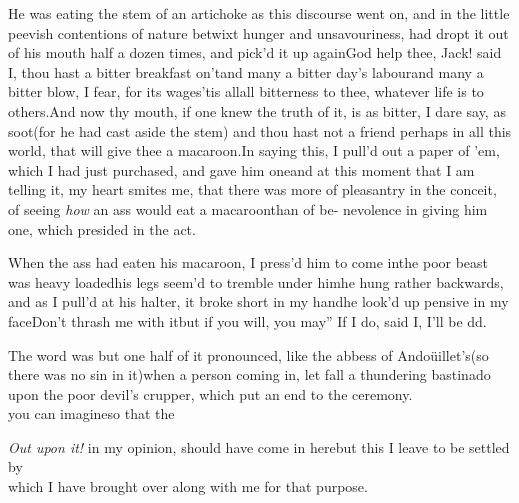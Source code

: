 \documentclass{article}
\begin{document}
He was eating the stem of an artichoke as this discourse went on, and in the little
peevish contentions of nature
betwixt hunger and unsavouriness, had dropt it out of his mouth
half a dozen times, and pick’d it up again\tsh God help thee,
Jack! said I, thou hast a bitter breakfast on’t\tsk and many a
bitter day’s labour\tsk and many a bitter blow, I fear, for its
wages\tsh ’tis all\tsk all bitterness to thee, whatever life is
to others.\break \tsh And now thy mouth, if one knew the truth
of it, is as bitter, I dare say, as soot\tsk (for he had cast
aside the stem) and thou hast not a friend perhaps in all this
world, that will give thee a macaroon.\tsh In saying this, I
pull’d out a paper of ’em, which I had just purchased, and gave
him one\tsk and at this moment that I am telling it, my heart
smites me, that there was more of plea\-santry in the conceit, of
seeing \textit{how} an ass would eat a macaroon\tsh than of
be-
nevolence in giving him one, which pre\-sided in the act.

When the ass had eaten his macaroon, I press’d him to come in\tsh the poor beast
was heavy loaded\tsh his legs seem’d to tremble under him\tsh he hung rather
backwards, and as I pull’d at his halter, it broke short in my
hand\tsh he look’d\break
up pensive in my face\tsk \lqq Don’t thrash\break
\lqq me with it\tsk but if you will, you may”\break
\tsh If I do, said I, I’ll be d\tsk d.

The word was but one half of it pronounced, like the abbess of Andoüillet’s\sic\tsk (so
there was no sin in it)\tsk when a person coming in, let fall a thundering bastinado
upon the poor devil’s crupper, which put an end to the
ceremony.\\[6pt]
\vfill
{}
\eject
\noindent
{}
you can imagine\tsh so that the

\textit{Out upon it!} in my opinion, should have come in here\tsh but this I leave
to be settled by\\[4pt]
\break
which I have brought over along with\break
me for that purpose.
\end{document}
